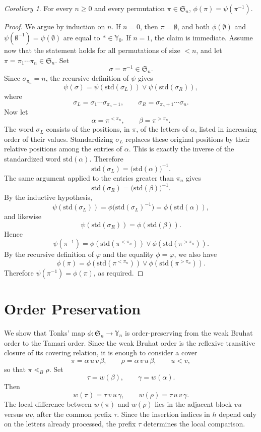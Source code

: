 \documentclass[a4paper]{article}
\theoremstyle{plain}
\theoremstyle{definition}
\theoremstyle{remark}
\numberwithin{equation}{section}
\newcommand{\Sym}{\mathfrak{S}}
\newcommand{\Y}{\mathbb{Y}}
\newcommand{\std}{\mathrm{std}}
\newtheorem{corollary}[theorem]{Corollary}
\begin{document}
\begin{corollary}\label{cor:phi-psi-inverse}
For every \(n\ge 0\) and every permutation \(\pi\in\Sym_n\), $\phi(\pi)=\psi(\pi^{-1})$.
\end{corollary}

\begin{proof}
We argue by induction on \(n\). If \(n=0\), then \(\pi=\emptyset\), and both \(\phi(\emptyset)\) and
\(\psi(\emptyset^{-1})=\psi(\emptyset)\) are equal to \(\ast\in\Y_0\).
If \(n=1\), the claim is immediate. Assume now that the statement holds for all permutations of size \(<n\), and let $\pi=\pi_1\cdots \pi_n\in\Sym_n$. Set
\[
\sigma=\pi^{-1}\in\Sym_n.
\]
Since \(\sigma_{\pi_n}=n\), the recursive definition of \(\psi\) gives
\[
\psi(\sigma)=\psi(\std(\sigma_L))\vee \psi(\std(\sigma_R)),
\]
where
\[
\sigma_L=\sigma_1\cdots \sigma_{\pi_n-1},
\qquad
\sigma_R=\sigma_{\pi_n+1}\cdots \sigma_n.
\]
Now let
\[
\alpha=\pi^{<\pi_n},
\qquad
\beta=\pi^{>\pi_n}.
\]
The word \(\sigma_L\) consists of the positions, in \(\pi\), of the letters of
\(\alpha\), listed in increasing order of their values. Standardizing
\(\sigma_L\) replaces these original positions by their relative positions
among the entries of \(\alpha\). This is exactly the inverse of the
standardized word \(\std(\alpha)\). Therefore
\[
\std(\sigma_L)={\bigl(\std(\alpha)\bigr)}^{-1}.
\]
The same argument applied to the entries greater than \(\pi_n\) gives
\[
\std(\sigma_R)={\bigl(\std(\beta)\bigr)}^{-1}.
\]
By the inductive hypothesis,
\[
\psi(\std(\sigma_L))
=
\phi\bigl({\std(\sigma_L)}^{-1}\bigr)
=
\phi(\std(\alpha)),
\]
and likewise
\[
\psi(\std(\sigma_R))
=
\phi(\std(\beta)).
\]
Hence
\[
\psi(\pi^{-1})
=
\phi(\std(\pi^{<\pi_n}))\vee \phi(\std(\pi^{>\pi_n})).
\]
By the recursive definition of \(\varphi\) and the equality $\phi=\varphi$, we also have
\[
\phi(\pi)=\phi(\std(\pi^{<\pi_n}))\vee \phi(\std(\pi^{>\pi_n})).
\]
Therefore $\psi(\pi^{-1})=\phi(\pi)$, as required.
\end{proof}
\section{Order Preservation}

We show that Tonks' map \(\phi:\Sym_n\to\Y_n\) is order-preserving from the weak
Bruhat order to the Tamari order. Since the weak Bruhat order is the reflexive
transitive closure of its covering relation, it is enough to consider a cover
\[
\pi=\alpha\,u\,v\,\beta,
\qquad
\rho=\alpha\,v\,u\,\beta,
\qquad
u<v,
\]
so that \(\pi\lessdot_B\rho\). Set
\[
\tau=w(\beta),
\qquad
\gamma=w(\alpha).
\]
Then
\[
w(\pi)=\tau\,v\,u\,\gamma,
\qquad
w(\rho)=\tau\,u\,v\,\gamma.
\]
The local difference between \(w(\pi)\) and \(w(\rho)\) lies in the adjacent
block \(vu\) versus \(uv\), after the common prefix \(\tau\). Since the
insertion indices in \(h\) depend only on the letters already processed, the
prefix \(\tau\) determines the local comparison.
\end{document}
